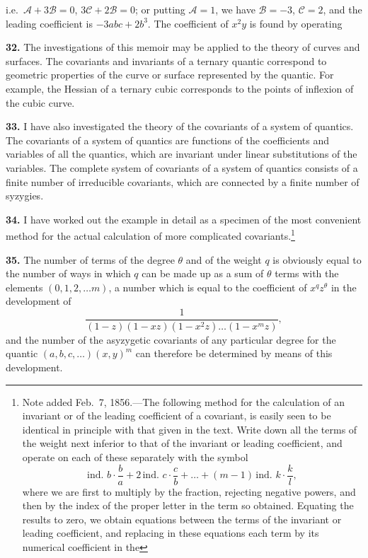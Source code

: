 \documentclass[12pt,a4paper]{article}
\begin{document}
\newpage
\setcounter{page}{259}

i.e.\ $\mathcal{A} + 3\mathcal{B} = 0$, $3\mathcal{C} + 2\mathcal{B} = 0$; or putting $\mathcal{A} = 1$, we have $\mathcal{B} = -3$, $\mathcal{C} = 2$, and the leading coefficient is $-3abc + 2b^3$. The coefficient of $x^2y$ is found by operating

\textbf{32.} The investigations of this memoir may be applied to the theory of curves and surfaces. The covariants and invariants of a ternary quantic correspond to geometric properties of the curve or surface represented by the quantic. For example, the Hessian of a ternary cubic corresponds to the points of inflexion of the cubic curve.

\textbf{33.} I have also investigated the theory of the covariants of a system of quantics. The covariants of a system of quantics are functions of the coefficients and variables of all the quantics, which are invariant under linear substitutions of the variables. The complete system of covariants of a system of quantics consists of a finite number of irreducible covariants, which are connected by a finite number of syzygies.

\newpage
\setcounter{page}{260}

\textbf{34.} I have worked out the example in detail as a specimen of the most convenient method for the actual calculation of more complicated covariants.\footnote{Note added Feb.\ 7, 1856.---The following method for the calculation of an invariant or of the leading coefficient of a covariant, is easily seen to be identical in principle with that given in the text. Write down all the terms of the weight next inferior to that of the invariant or leading coefficient, and operate on each of these separately with the symbol
\[
\text{ind.\ } b \cdot \frac{b}{a} + 2\, \text{ind.\ } c \cdot \frac{c}{b} + \ldots + (m-1)\, \text{ind.\ } k \cdot \frac{k}{l},
\]
where we are first to multiply by the fraction, rejecting negative powers, and then by the index of the proper letter in the term so obtained. Equating the results to zero, we obtain equations between the terms of the invariant or leading coefficient, and replacing in these equations each term by its numerical coefficient in the}

\textbf{35.} The number of terms of the degree $\theta$ and of the weight $q$ is obviously equal to the number of ways in which $q$ can be made up as a sum of $\theta$ terms with the elements $(0, 1, 2, \ldots m)$, a number which is equal to the coefficient of $x^q z^{\theta}$ in the development of
\[
\frac{1}{(1-z)(1-xz)(1-x^2z)\ldots(1-x^mz)},
\]
and the number of the asyzygetic covariants of any particular degree for the quantic $(a, b, c, \ldots)(x, y)^m$ can therefore be determined by means of this development.
\end{document}
